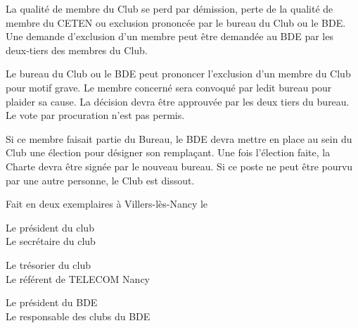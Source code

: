 \documentclass{article} %
\begin{document}
\begin{multicols}{2}
		{\small

			La qualité de membre du Club se perd par démission, perte
			de la qualité de membre du CETEN ou exclusion prononcée
			par le bureau du Club ou le BDE. Une demande d’exclusion
			d’un membre peut être demandée au BDE par les deux-tiers
			des membres du Club.

			Le bureau du Club ou le BDE peut prononcer l’exclusion d’un
			membre du Club pour motif grave. Le membre concerné
			sera convoqué par ledit bureau pour plaider sa cause. La
			décision devra être approuvée par les deux tiers du bureau.
			Le vote par procuration n’est pas permis.

			Si ce membre faisait partie du Bureau, le BDE devra mettre
			en place au sein du Club une élection pour désigner son
			remplaçant. Une fois l’élection faite, la Charte devra être
			signée par le nouveau bureau. Si ce poste ne peut être
			pourvu par une autre personne, le Club est dissout.

		}
		
	\end{multicols}

	\vfill
	Fait en deux exemplaires à Villers-lès-Nancy le \underline{\hspace{5cm}}
	\vfill

	\begin{multicols}{2}
		Le président du club \\
		Le secrétaire du club 
	\end{multicols}
		\vspace*{4cm}
	\begin{multicols}{2}
		Le trésorier du club \\
		Le référent de TELECOM Nancy 
	\end{multicols}
		\vspace*{4cm}
	\begin{multicols}{2}
		Le président du BDE \\
		Le responsable des clubs du BDE 
	\end{multicols}
		\vspace*{4cm}
\end{document}
